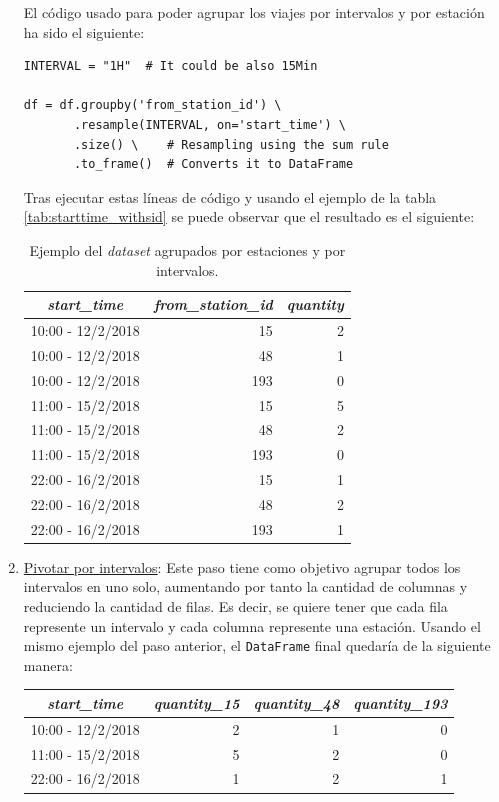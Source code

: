 \begin{enumerate}
    El código usado para poder agrupar los viajes por intervalos y por estación ha sido el siguiente:
    
    \begin{verbatim}
INTERVAL = "1H"  # It could be also 15Min

df = df.groupby('from_station_id') \
       .resample(INTERVAL, on='start_time') \
       .size() \    # Resampling using the sum rule
       .to_frame()  # Converts it to DataFrame
    \end{verbatim}
    
    Tras ejecutar estas líneas de código y usando el ejemplo de la tabla \ref{tab:starttime_withsid} se puede observar que el resultado es el siguiente:
    
    \begin{table}[H]
    \footnotesize
    \centering
    \begin{tabular}{c|rr}
        \toprule
          \textit{start\_time} & \textit{from\_station\_id} & \textit{quantity}  \\
        \midrule
        
        10:00 - 12/2/2018 & 15 & 2\\
        10:00 - 12/2/2018 & 48 & 1\\
        10:00 - 12/2/2018 & 193 & 0\\
        11:00 - 15/2/2018 & 15 & 5\\
        11:00 - 15/2/2018 & 48 & 2\\
        11:00 - 15/2/2018 & 193 & 0\\
        22:00 - 16/2/2018 & 15 & 1\\
        22:00 - 16/2/2018 & 48 & 2\\
        22:00 - 16/2/2018 & 193 & 1\\
        \bottomrule
    \end{tabular}
    \cprotect\caption{Ejemplo del \textit{dataset} agrupados por estaciones y por intervalos.}
    \label{tab:justintervals}
    \end{table}
    
    

    \item \underline{Pivotar por intervalos}: Este paso tiene como objetivo agrupar todos los intervalos en uno solo, aumentando por tanto la cantidad de columnas y reduciendo la cantidad de filas. Es decir, se quiere tener que cada fila represente un intervalo y cada columna represente una estación. Usando el mismo ejemplo del paso anterior, el \small{\verb|DataFrame|} final quedaría de la siguiente manera:
    \begin{table}[H]
    \footnotesize
    \centering
    \begin{tabular}{c|rrr}
        \toprule
        \textit{start\_time} & \textit{quantity\_15} & \textit{quantity\_48} & \textit{quantity\_193}  \\
        \midrule
        10:00 - 12/2/2018 & 2 & 1 & 0 \\
        11:00 - 15/2/2018 & 5 & 2 & 0 \\
        22:00 - 16/2/2018 & 1 & 2 & 1 \\
        

\end{tabular}
\end{table}
\end{enumerate}
